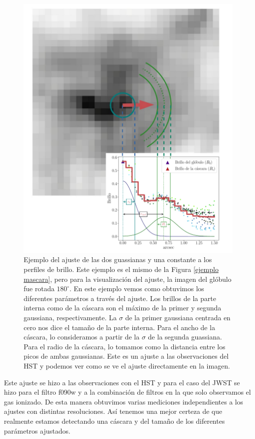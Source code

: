 \documentclass{book}
\begin{document}
\begin{figure}[htbp]
    \centering
    \includegraphics[width=\textwidth]{imagenes_corregidas/Ejemplo_ajuste_final.pdf}
    \caption{Ejemplo del ajuste de las dos guassianas y una constante a los perfiles de brillo. Este ejemplo es el mismo de la Figura \ref{ejemplo mascara}, pero para la visualización del ajuste, la imagen del glóbulo fue rotada $180^\circ$. En este ejemplo vemos como obtuvimos los diferentes parámetros a través del ajuste. Los brillos de la parte interna como de la cáscara son el máximo de la primer y segunda gaussiana, respectivamente. La $\sigma$ de la primer gaussiana centrada en cero nos dice el tamaño de la parte interna. Para el ancho de la cáscara, lo consideramos a partir de la $\sigma$ de la segunda guassiana. Para el radio de la cáscara, lo tomamos como la distancia entre los picos de ambas gaussianas. Este es un ajuste a las observaciones del HST y podemos ver como se ve el ajuste directamente en la imagen.}
    \label{ejemplo ajuste}
\end{figure}

Este ajuste se hizo a las observaciones con el HST y para el caso del JWST se hizo para el filtro f090w  y a la combinación de filtros en la que solo observamos el gas ionizado. De esta manera obtuvimos varias mediciones independientes a los ajustes con distintas resoluciones. Así tenemos una mejor certeza de que realmente estamos detectando una cáscara y del tamaño de los diferentes parámetros ajustados.
\end{document}
